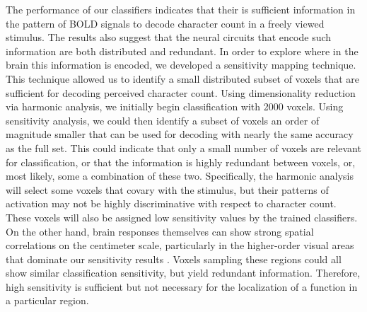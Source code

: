 \documentclass[authoryear]{elsarticle}
\begin{document}
The performance of our classifiers indicates that their is sufficient information in the pattern of BOLD signals to decode character count in a freely viewed stimulus. 
The results also suggest that the neural circuits that encode such information are both distributed and redundant.
In order to explore where in the brain this information is encoded, we developed a sensitivity mapping technique.
This technique allowed us to identify a small distributed subset of voxels that are sufficient for decoding perceived character count.
Using dimensionality reduction via harmonic analysis, we initially begin classification with 2000 voxels.
Using sensitivity analysis, we could then identify a subset of voxels an order of magnitude smaller that can be used for decoding with nearly the same accuracy as the full set.
This could indicate that only a small number of voxels are relevant for classification, or that the information is highly redundant between voxels, or, most likely, some a combination of these two.
Specifically, the harmonic analysis will select some voxels that covary with the stimulus, but their patterns of activation may not be highly discriminative with respect to character count.
These voxels will also be assigned low sensitivity values by the trained classifiers.
On the other hand, brain responses themselves can show strong spatial correlations on the centimeter scale, particularly in the higher-order visual areas that dominate our sensitivity results \citep{spatialcorrelations}. 
Voxels sampling these regions could all show similar classification sensitivity, but yield redundant information.
Therefore, high sensitivity is sufficient but not necessary for the localization of a function in a particular region.

\end{document}
